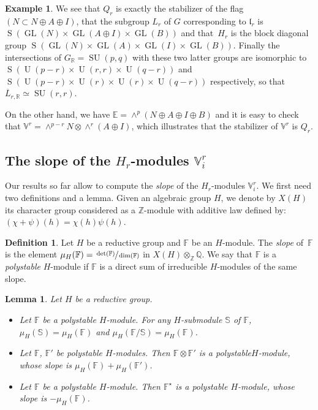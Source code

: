 \documentclass[10pt]{amsart}
\theoremstyle{plain}
\newtheorem{lemm}[theo]{Lemma}
\theoremstyle{definition}
\newtheorem{defi}[theo]{Definition}
\newtheorem{exem}[theo]{Example}
\let\ov\overline
\let\rgy r
\DeclareMathOperator{\GL}{GL}
\DeclareMathOperator{\rS}{S}
\DeclareMathOperator{\SU}{SU}
\DeclareMathOperator{\rU}{U}
\newcommand{\bE}{\mathbb{E}}
\newcommand{\bF}{\mathbb{F}}
\newcommand{\bS}{\mathbb{S}}
\newcommand{\bZ}{\mathbb{Z}}
\newcommand{\bR}{\mathbb{R}}
\newcommand{\bQ}{\mathbb{Q}}
\newcommand{\Vr}{\mathbb{V}^\rgy}
\newcommand{\fl}{\mathfrak{l}}
\begin{document}
\begin{exem}
We see that $Q_\rgy$ is exactly the stabilizer of the flag $(N \subset N \oplus A \oplus I)$, that
the subgroup $L_\rgy$ of $G$ corresponding to $\fl_\rgy$ is $\rS(\GL(N)\times\GL(A\oplus
I)\times\GL(B))$ and that~$H_\rgy$ is the block diagonal group $\rS(\GL(N) \times \GL(A) \times \GL(I) \times \GL(B))$.
Finally the intersections of $G_\bR=\SU(p,q)$ with these two latter groups are isomorphic to
$\rS(\rU(p-\rgy)\times\rU(\rgy,\rgy)\times\rU(q-\rgy))$ and $\rS(\rU(p-\rgy) \times \rU(\rgy)
\times \rU(\rgy) \times \rU(q-\rgy))$ respectively, so that
$\ov{L}_{\rgy,\bR}\simeq\SU(\rgy,\rgy)$.

On the other hand, we have $\bE=\wedge^p(N \oplus A \oplus I \oplus B)$ and it is easy to check that
$\Vr=\wedge^{p-\rgy}N \otimes \wedge^\rgy(A \oplus I)$, which illustrates that the stabilizer
of $\Vr$ is $Q_\rgy$.

\subsection{\texorpdfstring{The slope of the $H_\rgy$-modules $\Vr_i$}{The slope of the H-r modules V-r-i}}
\label{subsec:slopeVi}

Our results so far allow to compute the \emph{slope} of the $H_\rgy$-modules $\Vr_i$. We first need two
definitions and a lemma. Given an algebraic group $H$, we denote by $X(H)$ its character group
considered as a $\bZ$-module with additive law defined by: $(\chi+\psi)(h)=\chi(h)\psi(h)$.

\begin{defi}
\label{defi:polystable}
Let $H$ be a reductive group and $\bF$ be an $H$-module.
The \emph{slope} of~$\bF$ is the element $\mu_H(\bF)=\sfrac{\det(\bF)}{\dim(\bF)}$ in $X(H) \otimes_\bZ \bQ$.
We say that $\bF$ is a \emph{polystable} $H$-module if $\bF$ is a direct sum of irreducible
$H$-modules of the same slope.
\end{defi}

\begin{lemm}
\label{lemm:polystable}
Let $H$ be a reductive group.
\begin{itemize}
\item Let $\bF$ be a polystable $H$-module. For any $H$-submodule $\bS$ of $\bF$,
$\mu_H(\bS)=\mu_H(\bF)$ and $\mu_H(\bF/\bS)=\mu_H(\bF)$.
\item Let $\bF$, $\bF'$ be polystable $H$-modules. Then $\bF \otimes \bF'$ is a polystable$H$-module,
whose slope is $\mu_H(\bF)+\mu_H(\bF')$.
\item Let $\bF$ be a polystable $H$-module. Then $\bF^\star$ is a polystable
$H$-module, whose slope is $-\mu_H(\bF)$.
\end{itemize}
\end{lemm}


\end{exem}
\end{document}
